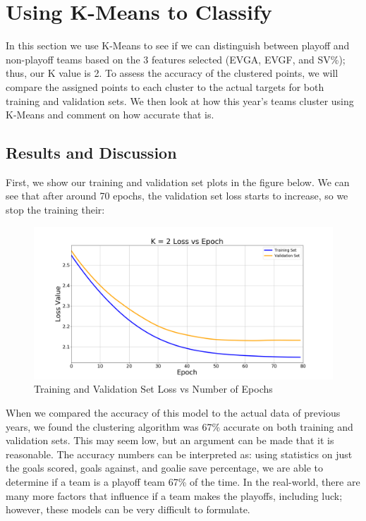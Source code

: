 \documentclass[10pt,letterpaper]{article}
\begin{document}
\section*{Using K-Means to Classify}
In this section we use K-Means to see if we can distinguish between playoff and non-playoff teams based on the 3 features selected (EVGA, EVGF, and SV\%); thus, our K value is 2. To assess the accuracy of the clustered points, we will compare the assigned points to each cluster to the actual targets for both training and validation sets. We then look at how this year's teams cluster using K-Means and comment on how accurate that is. 

\subsection*{Results and Discussion}
First, we show our training and validation set plots in the figure below. We can see that after around 70 epochs, the validation set loss starts to increase, so we stop the training their:
\begin{figure}[H]
    \centering
    \includegraphics[scale = 0.23]{kLoss.png}
    \caption{Training and Validation Set Loss vs Number of Epochs}
    \label{fig: kLoss}
\end{figure}

When we compared the accuracy of this model to the actual data of previous years, we found the clustering algorithm was 67\% accurate on both training and validation sets. This may seem low, but an argument can be made that it is reasonable. The accuracy numbers can be interpreted as: using statistics on just the goals scored, goals against, and goalie save percentage, we are able to determine if a team is a playoff team 67\% of the time. In the real-world, there are many more factors that influence if a team makes the playoffs, including luck; however, these models can be very difficult to formulate. 
\end{document}
